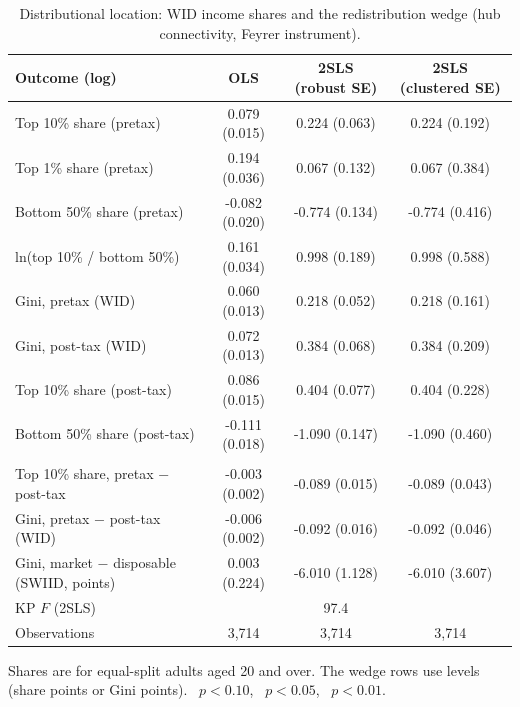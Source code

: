 \begin{table}[H]\centering\caption{Distributional location: WID income shares and the redistribution wedge (hub connectivity, Feyrer instrument).}\label{tab:tails}
\begin{threeparttable}\small\begin{tabular}{lccc}
\toprule
Outcome (log) & OLS & 2SLS (robust SE) & 2SLS (clustered SE) \\
\midrule
Top 10\% share (pretax) & 0.079\sym{***} (0.015) & 0.224\sym{***} (0.063) & 0.224 (0.192) \\
Top 1\% share (pretax) & 0.194\sym{***} (0.036) & 0.067 (0.132) & 0.067 (0.384) \\
Bottom 50\% share (pretax) & -0.082\sym{***} (0.020) & -0.774\sym{***} (0.134) & -0.774\sym{*} (0.416) \\
ln(top 10\% / bottom 50\%) & 0.161\sym{***} (0.034) & 0.998\sym{***} (0.189) & 0.998\sym{*} (0.588) \\
Gini, pretax (WID) & 0.060\sym{***} (0.013) & 0.218\sym{***} (0.052) & 0.218 (0.161) \\
Gini, post-tax (WID) & 0.072\sym{***} (0.013) & 0.384\sym{***} (0.068) & 0.384\sym{*} (0.209) \\
Top 10\% share (post-tax) & 0.086\sym{***} (0.015) & 0.404\sym{***} (0.077) & 0.404\sym{*} (0.228) \\
Bottom 50\% share (post-tax) & -0.111\sym{***} (0.018) & -1.090\sym{***} (0.147) & -1.090\sym{**} (0.460) \\
\addlinespace\multicolumn{4}{l}{\emph{Redistribution wedge (levels)}}\\
Top 10\% share, pretax $-$ post-tax & -0.003 (0.002) & -0.089\sym{***} (0.015) & -0.089\sym{**} (0.043) \\
Gini, pretax $-$ post-tax (WID) & -0.006\sym{**} (0.002) & -0.092\sym{***} (0.016) & -0.092\sym{**} (0.046) \\
Gini, market $-$ disposable (SWIID, points) & 0.003 (0.224) & -6.010\sym{***} (1.128) & -6.010\sym{*} (3.607) \\
\midrule
KP $F$ (2SLS) & & 97.4 & \\
Observations & 3,714 & 3,714 & 3,714 \\
\bottomrule
\end{tabular}
\begin{tablenotes}\footnotesize\item Shares are for equal-split adults aged 20 and over. The wedge rows use levels (share points or Gini points). \sym{*}~$p<0.10$, \sym{**}~$p<0.05$, \sym{***}~$p<0.01$.\end{tablenotes}\end{threeparttable}\end{table}

